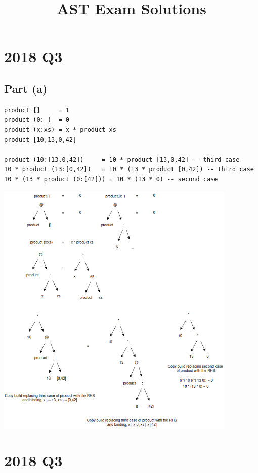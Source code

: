 \documentclass[11pt]{article}
\date{}
\title{AST Exam Solutions}
\begin{document}
\maketitle
\section{2018 Q3}
\label{sec:org266044c}
\subsection{Part (a)}
\label{sec:orgf54e15a}
\begin{verbatim}
product []     = 1
product (0:_)  = 0
product (x:xs) = x * product xs
product [10,13,0,42]

product (10:[13,0,42])     = 10 * product [13,0,42] -- third case
10 * product (13:[0,42])   = 10 * (13 * product [0,42]) -- third case
10 * (13 * product (0:[42])) = 10 * (13 * 0) -- second case
\end{verbatim}
\begin{center}
\includegraphics[width=115mm]{./product-xs.png}
\end{center}
\section{2018 Q3}
\label{sec:org91b99c0}
\end{document}
